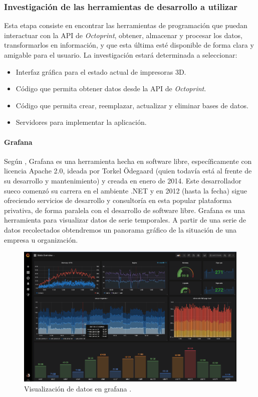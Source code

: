 \subsubsection{Investigación de las herramientas de desarrollo a utilizar}

Esta etapa consiste en encontrar las herramientas de programación que puedan interactuar con la API de \textit{Octoprint}, obtener, almacenar y procesar los datos, transformarlos en información, y que esta última esté disponible de forma clara y amigable para el usuario. La investigación estará determinada a seleccionar:

\begin{itemize}
\item Interfaz gráfica para el estado actual de impresoras 3D.
\item Código que permita obtener datos desde la API de \textit{Octoprint}.
\item Código que permita crear, reemplazar, actualizar y eliminar bases de datos.
\item Servidores para implementar la aplicación. 
\end{itemize} 

\paragraph{Grafana} Según \cite{olano2019}, Grafana es una herramienta hecha en software libre, específicamente con licencia Apache 2.0, ideada por Torkel Ödegaard (quien todavía está al frente de su desarrollo y mantenimiento) y creada en enero de 2014. Este desarrollador sueco comenzó su carrera en el ambiente .NET y en 2012 (hasta la fecha) sigue ofreciendo servicios de desarrollo y consultoría en esta popular plataforma privativa, de forma paralela con el desarrollo de software libre. Grafana es una herramienta para visualizar datos de serie temporales. A partir de una serie de datos recolectados obtendremos un panorama gráfico de la situación de una empresa u organización.

\begin{figure}[H]
\centering
\includegraphics[scale=0.5]{images/grafana.png}
\caption{Visualización de datos en grafana \parencite{olano2019}.}
\end{figure}

